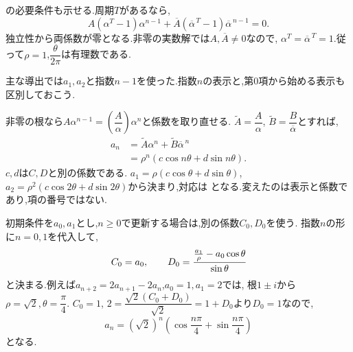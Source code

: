  の必要条件も示せる.周期$T$があるなら,
  \[
    A(\alpha^T-1)\alpha^{n-1}
    +\overline A(\overline\alpha^{\,T}-1)\overline\alpha^{\,n-1}=0.
  \]
  独立性から両係数が零となる.非零の実数解では$A,\overline A\ne0$なので,
  $\alpha^T=\overline\alpha^{\,T}=1$.従って$\rho=1$,$\dfrac{\theta}{2\pi}$は有理数である.

  主な導出では$a_1,a_2$と指数$n-1$を使った.指数$n$の表示と,第0項から始める表示も区別しておこう.

  非零の根なら$A\alpha^{n-1}=\left(\dfrac{A}{\alpha}\right)\alpha^n$と係数を取り直せる.
  $\widetilde A=\dfrac{A}{\alpha}$, $\widetilde B=\dfrac{B}{\overline\alpha}$とすれば,
  \[
    \begin{aligned}
      a_n&=\widetilde A\alpha^n+\widetilde B\overline\alpha^{\,n}\\
         &=\rho^n(c\cos n\theta+d\sin n\theta).
    \end{aligned}
  \]
  $c,d$は$C,D$と別の係数である.
  $a_1=\rho(c\cos\theta+d\sin\theta)$,
  $a_2=\rho^2(c\cos2\theta+d\sin2\theta)$から決まり,対応は
  \BookMathLayout{\[
    c=\frac{C\cos\theta-D\sin\theta}{\rho},\qquad
    d=\frac{C\sin\theta+D\cos\theta}{\rho}
  \]}{\[
    \begin{aligned}
      c&=\frac{C\cos\theta-D\sin\theta}{\rho},\\
      d&=\frac{C\sin\theta+D\cos\theta}{\rho}
    \end{aligned}
  \]}
  となる.変えたのは表示と係数であり,項の番号ではない.

  初期条件を$a_0,a_1$とし,$n\ge0$で更新する場合は,別の係数$C_0,D_0$を使う.
  指数$n$の形に$n=0,1$を代入して,
  \[
    C_0=a_0,\qquad
    D_0=\cfrac{\frac{a_1}{\rho}-a_0\cos\theta}{\sin\theta}
  \]
  と決まる.例えば$a_{n+2}=2a_{n+1}-2a_n$,$a_0=1,a_1=2$では,
  根$1\pm i$から$\rho=\sqrt2,\theta=\dfrac{\pi}{4}$.
  $C_0=1$, $2=\dfrac{\sqrt2(C_0+D_0)}{\sqrt2}=1+D_0$より$D_0=1$なので,
  \[
    a_n=(\sqrt2)^n\left(\cos\frac{n\pi}{4}+\sin\frac{n\pi}{4}\right)
  \]
  となる.
